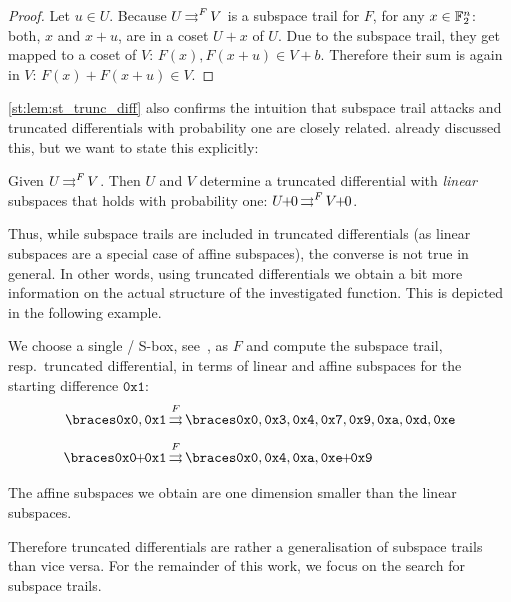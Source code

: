 \begin{proof}
    Let $u \in U$.
    Because $U \operatorname*{\rightrightarrows}^{F}_{} V$ is a subspace trail for $F$, for any $x \in \mathbb{F}_2^n$: both, $x$ and $x + u$, are in a coset $U + x$ of $U$.
    Due to the subspace trail, they get mapped to a coset of $V$: $F(x), F(x+u) \in V + b$.
    Therefore their sum is again in $V$: $F(x) + F(x + u) \in V$.
\end{proof}

\cref{st:lem:st_trunc_diff} also confirms the intuition that subspace trail attacks and truncated differentials with probability one are closely related.
\textcite{ToSC:GraRecRon16} already discussed this, but we want to state this explicitly:

\begin{corollary}
    Given $U \operatorname*{\rightrightarrows}^{F}_{} V$.
    Then $U$ and $V$ determine a truncated differential with \emph{linear} subspaces that holds with probability one: $\propDiff{\coset{U}{0}}{F}{}{\coset{V}{0}}$.
\end{corollary}

Thus, while subspace trails are included in truncated differentials (as linear subspaces are a special case of affine subspaces), the converse is not true in general.
In other words, using truncated differentials we obtain a bit more information on the actual structure of the investigated function.
This is depicted in the following example.
\begin{example}\label{st:example:present}
We choose a single \present/ S-box, see~\cite{CHES:BKLPPR07}, as $F$ and compute the subspace trail, resp.\ truncated differential, in terms of linear and affine subspaces for the starting difference $\mathtt{0x1}$:
\begin{align*}
    \set{\mathtt{0x0}, \mathtt{0x1}} &\propDiff{}{F}{}{} \set{\mathtt{0x0}, \mathtt{0x3}, \mathtt{0x4}, \mathtt{0x7}, \mathtt{0x9}, \mathtt{0xa}, \mathtt{0xd}, \mathtt{0xe}} \\
    \coset{\set{\mathtt{0x0}}}{\mathtt{0x1}} &\propDiff{}{F}{}{} \coset{\set{\mathtt{0x0}, \mathtt{0x4}, \mathtt{0xa}, \mathtt{0xe}}}{\mathtt{0x9}}
\end{align*}
The affine subspaces we obtain are one dimension smaller than the linear subspaces.
\end{example}
Therefore truncated differentials are rather a generalisation of subspace trails than vice versa.
For the remainder of this work, we focus on the search for subspace trails.

